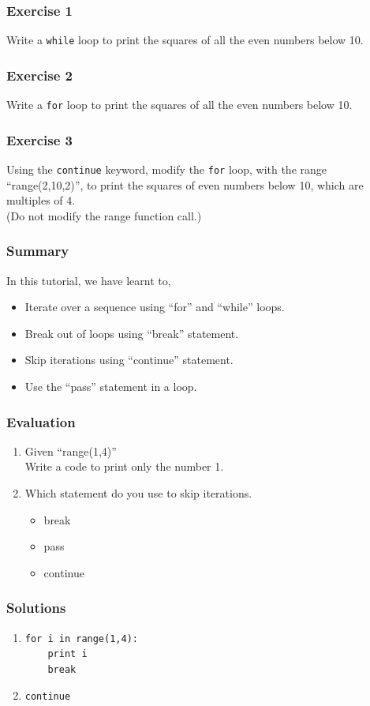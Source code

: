 \documentclass[presentation]{beamer}
\begin{document}
\begin{frame}
\frametitle{Exercise 1}
\label{sec-4}

  Write a \verb~while~ loop to print the squares of all the even
  numbers below 10. 
\end{frame}
\begin{frame}
\frametitle{Exercise 2}
\label{sec-5}

  Write a \verb~for~ loop to print the squares of all the even numbers
  below 10.
\end{frame}
\begin{frame}
\frametitle{Exercise 3}
\label{sec-6}

  Using the \verb~continue~ keyword, modify the \verb~for~ loop, with the range ``range(2,10,2)'', to print the
  squares of even numbers below 10, which are multiples of 4.\\
  (Do not modify the range function call.)
\end{frame}
\begin{frame}
\frametitle{Summary}
\label{sec-7}

 In this tutorial, we have learnt to,

\begin{itemize}
\item Iterate over a sequence using ``for'' and ``while'' loops.
\item Break out of loops using ``break'' statement.
\item Skip iterations using ``continue'' statement.
\item Use the ``pass'' statement in a loop.
\end{itemize}
\end{frame}
\begin{frame}
\frametitle{Evaluation}
\label{sec-8}


\begin{enumerate}
\item Given ``range(1,4)'' \\ Write a code to print only the number 1.
\vspace{12pt}
\item Which statement do you use to skip iterations.
\begin{itemize}
\item break
\item pass
\item continue
\end{itemize}
\end{enumerate}
\end{frame}
\begin{frame}[fragile]
\frametitle{Solutions}
\label{sec-9}


\begin{enumerate}
\item \lstset{language=Python}
\begin{lstlisting}
for i in range(1,4):
    print i
    break
\end{lstlisting}
\vspace{8pt}
\item \verb~continue~
\end{enumerate}
\end{frame}
\end{document}

